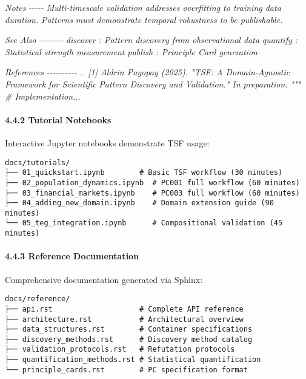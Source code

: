 \documentclass[
]{article}
\newenvironment{Shaded}{}{}
\newcommand{\CommentTok}[1]{\textcolor[rgb]{0.38,0.63,0.69}{\textit{#1}}}
\begin{document}
\begin{Shaded}
\begin{Highlighting}[]
\CommentTok{    Notes}
\CommentTok{    {-}{-}{-}{-}{-}}
\CommentTok{    Multi{-}timescale validation addresses overfitting to training data duration.}
\CommentTok{    Patterns must demonstrate temporal robustness to be publishable.}

\CommentTok{    See Also}
\CommentTok{    {-}{-}{-}{-}{-}{-}{-}{-}}
\CommentTok{    discover : Pattern discovery from observational data}
\CommentTok{    quantify : Statistical strength measurement}
\CommentTok{    publish : Principle Card generation}

\CommentTok{    References}
\CommentTok{    {-}{-}{-}{-}{-}{-}{-}{-}{-}{-}}
\CommentTok{    .. [1] Aldrin Payopay (2025). "TSF: A Domain{-}Agnostic Framework for Scientific}
\CommentTok{           Pattern Discovery and Validation." In preparation.}
\CommentTok{    """}
    \CommentTok{\# Implementation...}
\end{Highlighting}
\end{Shaded}

\paragraph{4.4.2 Tutorial Notebooks}\label{tutorial-notebooks}

Interactive Jupyter notebooks demonstrate TSF usage:

\begin{verbatim}
docs/tutorials/
├── 01_quickstart.ipynb        # Basic TSF workflow (30 minutes)
├── 02_population_dynamics.ipynb  # PC001 full workflow (60 minutes)
├── 03_financial_markets.ipynb    # PC003 full workflow (60 minutes)
├── 04_adding_new_domain.ipynb    # Domain extension guide (90 minutes)
└── 05_teg_integration.ipynb      # Compositional validation (45 minutes)
\end{verbatim}

\paragraph{4.4.3 Reference Documentation}\label{reference-documentation}

Comprehensive documentation generated via Sphinx:

\begin{verbatim}
docs/reference/
├── api.rst                    # Complete API reference
├── architecture.rst           # Architectural overview
├── data_structures.rst        # Container specifications
├── discovery_methods.rst      # Discovery method catalog
├── validation_protocols.rst   # Refutation protocols
├── quantification_methods.rst # Statistical quantification
└── principle_cards.rst        # PC specification format
\end{verbatim}
\end{document}
